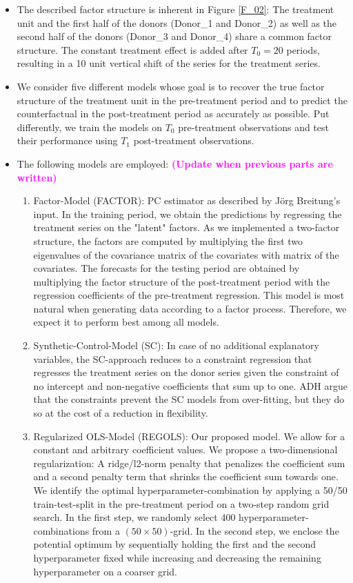 \begin{itemize}
	\item The described factor structure is inherent in Figure \ref{F_02}: The treatment unit and the first half of the donors (Donor\_1 and Donor\_2) as well as the second half of the donors (Donor\_3 and Donor\_4) share a common factor structure. The constant treatment effect is added after $T_0 = 20$ periods, resulting in a 10 unit vertical shift of the series for the treatment series.
	\item We consider five different models whose goal is to recover the true factor structure of the treatment unit in the pre-treatment period and to predict the counterfactual in the post-treatment period as accurately as possible. Put differently, we train the models on $T_0$ pre-treatment observations and test their performance using $T_1$ post-treatment observations.
	\item The following models are employed: \textcolor{magenta}{\textbf{(Update when previous parts are written)}}
	\begin{enumerate}
		\item Factor-Model (FACTOR): \ac{PC} estimator as described by Jörg Breitung's input. In the training period, we obtain the predictions by regressing the treatment series on the "latent" factors. As we implemented a two-factor structure, the factors are computed by multiplying the first two eigenvalues of the covariance matrix of the covariates with matrix of the covariates. The forecasts for the testing period are obtained by multiplying the factor structure of the post-treatment period with the regression coefficients of the pre-treatment regression. This model is most natural when generating data according to a factor process. Therefore, we expect it to perform best among all models.
		\item Synthetic-Control-Model (SC): In case of no additional explanatory variables, the \ac{SC}-approach reduces to a constraint regression that regresses the treatment series on the donor series given the constraint of no intercept and non-negative coefficients that sum up to one. \ac{ADH} argue that the constraints prevent the SC models from over-fitting, but they do so at the cost of a reduction in flexibility.
		\item Regularized OLS-Model (REGOLS): Our proposed model. We allow for a constant and arbitrary coefficient values. We propose a two-dimensional regularization: A ridge/l2-norm penalty that penalizes the coefficient sum and a second penalty term that shrinks the coefficient sum towards one. We identify the optimal hyperparameter-combination by applying a 50/50 train-test-split in the pre-treatment period on a two-step random grid search. In the first step, we randomly select 400 hyperparameter-combinations from a $(50 \times 50)$-grid. In the second step, we enclose the potential optimum by sequentially holding the first and the second hyperparameter fixed while increasing and decreasing the remaining hyperparameter on a coarser grid. 

\end{enumerate}
\end{itemize}
